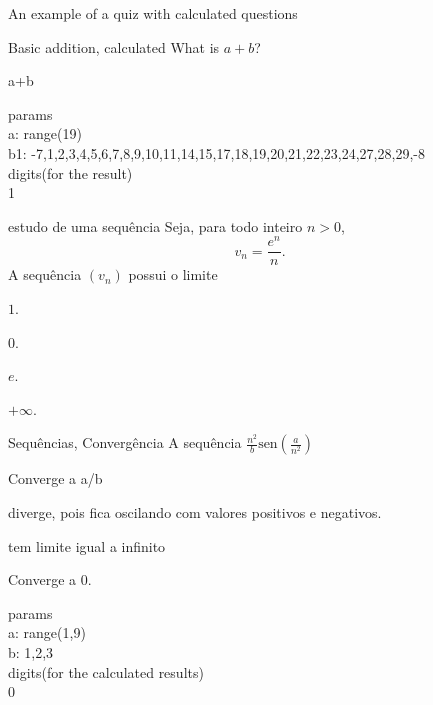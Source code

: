 \documentclass[12pt]{article}
\begin{document}
\begin{quiz}{An example of a quiz with calculated questions}
\begin{numerical}[points=2]{Basic addition, calculated}
  What is ${a}+{b}$?
  \item {a}+{b}
  \end{numerical}
  params\\
  a: range(19)\\
  b1: -7,1,2,3,4,5,6,7,8,9,10,11,14,15,17,18,19,20,21,22,23,24,27,28,29,-8\\
  digits(for the result)\\
  1

  \begin{multi}{estudo de uma sequência}
  Seja, para todo inteiro $n>0$, \[v_n=\frac{e^n}{n}.\]
  A sequência $(v_n)$ possui o limite
  \item $1$.
  \item $0$.
  \item $e$.
  \item* $+\infty$.
  \end{multi}


\begin{multi}[multiple]{Sequências, Convergência}
A sequência $\displaystyle \frac{n^2}{{b}} \text{sen}\left(\frac{{a}}{n^{2}}\right)$
\item* Converge a {a}/{b}
\item diverge, pois fica oscilando com valores positivos e negativos.
\item tem limite igual a infinito
\item Converge a 0.
\end{multi}
params\\
a: range(1,9)\\
b: 1,2,3\\
digits(for the calculated results)\\
0
\end{quiz}
\end{document}
